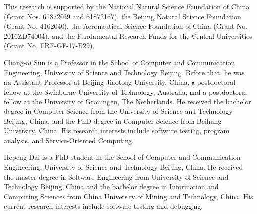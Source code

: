 \documentclass[10pt,journal,compsoc]{IEEEtran}
\begin{document}
This research is supported by
the National Natural Science Foundation of China (Grant Nos. 61872039 and 61872167),
the Beijing Natural Science Foundation (Grant No. 4162040),
the Aeronautical Science Foundation of China (Grant No. 2016ZD74004), and
the Fundamental Research Funds for the Central Universities (Grant No. FRF-GF-17-B29).
\ifCLASSOPTIONcaptionsoff
  \newpage
\fi


\begin{IEEEbiography}{Chang-ai Sun} is a Professor in the School of Computer and Communication Engineering, University of Science and Technology Beijing.
Before that, he was an Assistant Professor at Beijing Jiaotong University, China, a postdoctoral fellow at the Swinburne University of Technology, Australia, and a postdoctoral fellow at the University of Groningen, The Netherlands. He received the bachelor degree in Computer Science from the University of Science and Technology Beijing, China, and the PhD degree in Computer Science from Beihang University, China.
His research interests include software testing, program analysis, and Service-Oriented Computing.
\end{IEEEbiography}
\begin{IEEEbiography}{Hepeng Dai} is a PhD student in the School of Computer and Communication Engineering, University of Science and Technology Beijing, China. He received the master degree in Software Engineering from University of Science and Technology Beijing, China and the bachelor degree in Information and Computing Sciences from China University of Mining and Technology, China. His current research interests include software testing and debugging.
\end{IEEEbiography}
\end{document}
